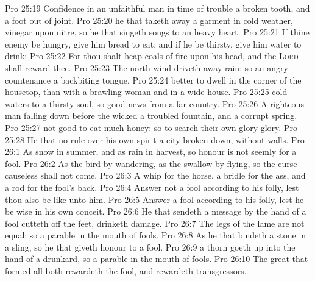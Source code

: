 \vs Pro 25:19 Confidence in an unfaithful man in time of trouble  a broken tooth, and a foot out of joint.
\vs Pro 25:20  he that taketh away a garment in cold weather,  vinegar upon nitre, so  he that singeth songs to an heavy heart.
\vs Pro 25:21 If thine enemy be hungry, give him bread to eat; and if he be thirsty, give him water to drink:
\vs Pro 25:22 For thou shalt heap coals of fire upon his head, and the \textsc{Lord} shall reward thee.
\vs Pro 25:23 The north wind driveth away rain: so  an angry countenance a backbiting tongue.
\vs Pro 25:24  better to dwell in the corner of the housetop, than with a brawling woman and in a wide house.
\vs Pro 25:25  cold waters to a thirsty soul, so  good news from a far country.
\vs Pro 25:26 A righteous man falling down before the wicked  a troubled fountain, and a corrupt spring.
\vs Pro 25:27  not good to eat much honey: so  to search their own glory  glory.
\vs Pro 25:28 He that  no rule over his own spirit  a city  broken down,  without walls.
\vs Pro 26:1 As snow in summer, and as rain in harvest, so honour is not seemly for a fool.
\vs Pro 26:2 As the bird by wandering, as the swallow by flying, so the curse causeless shall not come.
\vs Pro 26:3 A whip for the horse, a bridle for the ass, and a rod for the fool's back.
\vs Pro 26:4 Answer not a fool according to his folly, lest thou also be like unto him.
\vs Pro 26:5 Answer a fool according to his folly, lest he be wise in his own conceit.
\vs Pro 26:6 He that sendeth a message by the hand of a fool cutteth off the feet,  drinketh damage.
\vs Pro 26:7 The legs of the lame are not equal: so  a parable in the mouth of fools.
\vs Pro 26:8 As he that bindeth a stone in a sling, so  he that giveth honour to a fool.
\vs Pro 26:9  a thorn goeth up into the hand of a drunkard, so  a parable in the mouth of fools.
\vs Pro 26:10 The great  that formed all  both rewardeth the fool, and rewardeth transgressors.
